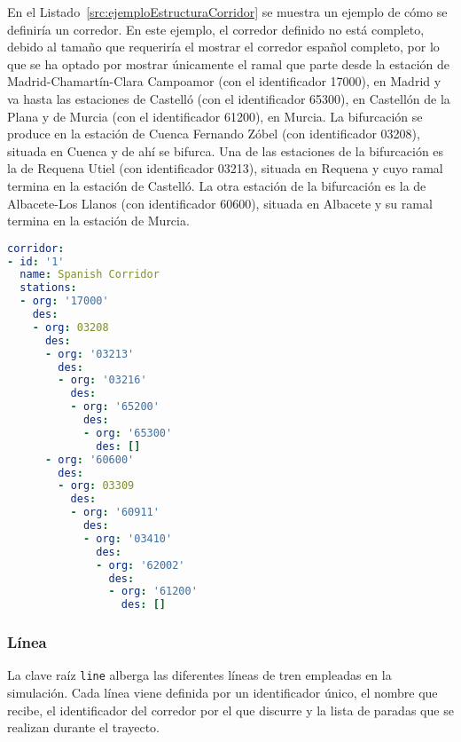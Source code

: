 En el Listado~\ref{src:ejemploEstructuraCorridor} se muestra un ejemplo de cómo se definiría un corredor. En este ejemplo, el corredor definido no está completo, debido al tamaño que requeriría el mostrar el corredor español completo, por lo que se ha optado por mostrar únicamente el ramal que parte desde la estación de Madrid-Chamartín-Clara Campoamor (con el identificador 17000), en Madrid y va hasta las estaciones de Castelló (con el identificador 65300), en Castellón de la Plana y de Murcia (con el identificador 61200), en Murcia. La bifurcación se produce en la estación de Cuenca Fernando Zóbel (con identificador 03208), situada en Cuenca y de ahí se bifurca. Una de las estaciones de la bifurcación es la de Requena Utiel (con identificador 03213), situada en Requena y cuyo ramal termina en la estación de Castelló. La otra estación de la bifurcación es la de Albacete-Los Llanos (con identificador 60600), situada en Albacete y su ramal termina en la estación de Murcia.

\begin{lstlisting}[language=YAML,
                   frame=none,
                   numbers=none,
                   basicstyle=\ttfamily\normalsize,
                   caption={Ejemplo con datos reales de la estructura de \texttt{corridor}},
                   label=src:ejemploEstructuraCorridor,
                   inputencoding=utf8]
corridor:
- id: '1'
  name: Spanish Corridor
  stations:
  - org: '17000'
    des:
    - org: 03208
      des:
      - org: '03213'
        des:
        - org: '03216'
          des:
          - org: '65200'
            des:
            - org: '65300'
              des: []
      - org: '60600'
        des:
        - org: 03309
          des:
          - org: '60911'
            des:
            - org: '03410'
              des:
              - org: '62002'
                des:
                - org: '61200'
                  des: []
\end{lstlisting}

\subsubsection{Línea}

La clave raíz \texttt{line} alberga las diferentes líneas de tren empleadas en la simulación. Cada línea viene definida por un identificador único, el nombre que recibe, el identificador del corredor por el que discurre y la lista de paradas que se realizan durante el trayecto.


